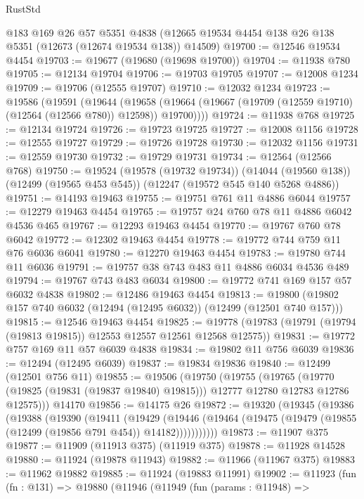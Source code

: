 \begin{lexlean}{RustStd}
\begin{coremodule}
    @183
    @169
    @26
    @57
    @5351
    @4838
    (@12665 @19534 @4454 @138 @26 @138 @5351 (@12673 (@12674 @19534 @138)) @14509)
@19700 := @12546 @19534 @4454
@19703 := @19677 (@19680 (@19698 @19700))
@19704 := @11938 @780
@19705 := @12134 @19704
@19706 := @19703 @19705
@19707 := @12008 @1234
@19709 := @19706 (@12555 @19707)
@19710 := @12032 @1234
@19723 := @19586
    (@19591
      (@19644
        (@19658 (@19664 (@19667 (@19709 (@12559 @19710) (@12564 (@12566 @780)) @12598)) @19700))))
@19724 := @11938 @768
@19725 := @12134 @19724
@19726 := @19723 @19725
@19727 := @12008 @1156
@19728 := @12555 @19727
@19729 := @19726 @19728
@19730 := @12032 @1156
@19731 := @12559 @19730
@19732 := @19729 @19731
@19734 := @12564 (@12566 @768)
@19750 := @19524
    (@19578 (@19732 @19734))
    (@14044 (@19560 @138))
    (@12499 (@19565 @453 @545))
    (@12247 (@19572 @545 @140 @5268 @4886))
@19751 := @14193 @19463
@19755 := @19751 @761 @11 @4886 @6044
@19757 := @12279 @19463 @4454
@19765 := @19757 @24 @760 @78 @11 @4886 @6042 @4536 @465
@19767 := @12293 @19463 @4454
@19770 := @19767 @760 @78 @6042
@19772 := @12302 @19463 @4454
@19778 := @19772 @744 @759 @11 @76 @6036 @6041
@19780 := @12270 @19463 @4454
@19783 := @19780 @744 @11 @6036
@19791 := @19757 @38 @743 @483 @11 @4886 @6034 @4536 @489
@19794 := @19767 @743 @483 @6034
@19800 := @19772 @741 @169 @157 @57 @6032 @4838
@19802 := @12486 @19463 @4454
@19813 := @19800 (@19802 @157 @740 @6032 (@12494 (@12495 @6032)) (@12499 (@12501 @740 @157)))
@19815 := @12546 @19463 @4454
@19825 := @19778 (@19783 (@19791 (@19794 (@19813 @19815)) @12553 @12557 @12561 @12568 @12575))
@19831 := @19772 @757 @169 @11 @57 @6039 @4838
@19834 := @19802 @11 @756 @6039
@19836 := @12494 (@12495 @6039)
@19837 := @19834 @19836
@19840 := @12499 (@12501 @756 @11)
@19855 := @19506
    (@19750
      (@19755
        (@19765
          (@19770 (@19825 (@19831 (@19837 @19840) @19815)))
          @12777
          @12780
          @12783
          @12786
          @12575)))
    @14170
@19856 := @14175 @26
@19872 := @19320
    (@19345
      (@19386
        (@19388
          (@19390
            (@19411
              (@19429
                (@19446
                  (@19464 (@19475 (@19479 (@19855 (@12499 (@19856 @791 @454)) @14182)))))))))))
@19873 := @11907 @375
@19877 := @11909 (@11913 @375) (@11919 @375)
@19878 := @11928 @14528
@19880 := @11924 (@19878 @11943)
@19882 := @11966 (@11967 @375)
@19883 := @11962 @19882
@19885 := @11924 (@19883 @11991)
@19902 := @11923
    (fun (fn : @131) =>
    @19880
      (@11946
        (@11949
          (fun (params : @11948) =>

\end{coremodule}
\end{lexlean}
